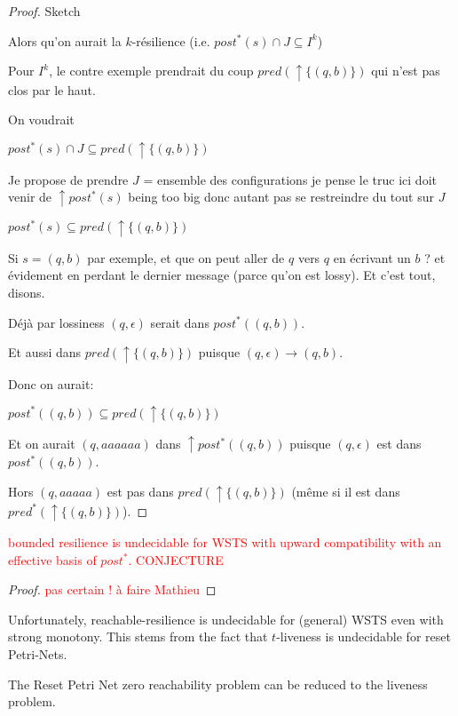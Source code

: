 \begin{proof}{Sketch}
{Alors qu'on aurait la $k$-résilience (i.e. $post^* (s) \cap J \subseteq I^k$)

Pour $I^k$, le contre exemple prendrait du coup $pred(\uparrow \{ (q,b)\})$ qui n'est pas clos par le haut.

On voudrait

$post^*(s) \cap J \subseteq pred(\uparrow \{ (q,b)\})$


Je propose de prendre $J$ = ensemble des configurations je pense le truc ici doit venir de
$\uparrow post^* (s)$ being too big
donc autant pas se restreindre du tout sur $J$


$post^*(s) \subseteq pred(\uparrow \{ (q,b)\})$

Si $s=(q,b)$ par exemple, et que on peut aller de $q$ vers $q$ en écrivant un 
$b$ ? et évidement en perdant le dernier message (parce qu'on est lossy). Et c'est tout, disons.

Déjà par lossiness $(q,\epsilon)$ serait dans $post^*((q,b))$.

Et aussi dans $pred(\uparrow \{ (q,b)\})$ puisque $(q,\epsilon) \to (q,b)$.

Donc on aurait:

$post^*((q,b))  \subseteq pred(\uparrow \{ (q,b)\})$

Et on aurait $(q,aaaaaa)$ dans 
$\uparrow post^* ((q,b))$ puisque $(q,\epsilon)$ est dans $post^* ((q,b))$.

Hors $(q,aaaaa)$ est pas dans $pred(\uparrow \{ (q,b)\})$
(même si il est dans $pred^*(\uparrow \{ (q,b)\})$).

}
\fi 
 
\end{proof}


\begin{proposition}
\textcolor{red}{
{\sc bounded resilience} is undecidable for WSTS with upward compatibility with an effective basis of $post^*$.
CONJECTURE
}
\end{proposition}

\begin{proof}
 \textcolor{red}{pas certain ! à faire Mathieu}
\end{proof}


Unfortunately, reachable-resilience is undecidable for (general) WSTS even with strong monotony.
This stems from the fact that $t$-liveness is undecidable for reset Petri-Nets.


\begin{theorem}
The  Reset Petri Net zero reachability problem can be reduced to the liveness problem.
\end{theorem}

